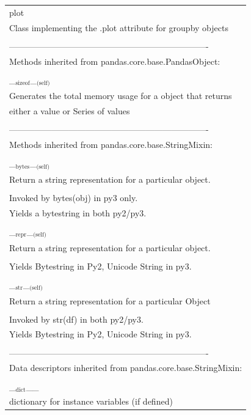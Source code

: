\documentclass[11pt]{article}
\begin{document}
\begin{enumerate}
\begin{enumerate}
\begin{enumerate}
\begin{center}
\begin{tabular}{l}
plot\\
Class implementing the .plot attribute for groupby objects\\
\\
----------------------------------------------------------------------\\
Methods inherited from pandas.core.base.PandasObject:\\
\\
\_\(_{\text{sizeof}}\)\_\(_{\text{(self)}}\)\\
Generates the total memory usage for a object that returns\\
either a value or Series of values\\
\\
----------------------------------------------------------------------\\
Methods inherited from pandas.core.base.StringMixin:\\
\\
\_\(_{\text{bytes}}\)\_\(_{\text{(self)}}\)\\
Return a string representation for a particular object.\\
\\
Invoked by bytes(obj) in py3 only.\\
Yields a bytestring in both py2/py3.\\
\\
\_\(_{\text{repr}}\)\_\(_{\text{(self)}}\)\\
Return a string representation for a particular object.\\
\\
Yields Bytestring in Py2, Unicode String in py3.\\
\\
\_\(_{\text{str}}\)\_\(_{\text{(self)}}\)\\
Return a string representation for a particular Object\\
\\
Invoked by str(df) in both py2/py3.\\
Yields Bytestring in Py2, Unicode String in py3.\\
\\
----------------------------------------------------------------------\\
Data descriptors inherited from pandas.core.base.StringMixin:\\
\\
\_\(_{\text{dict}}\)\_\_\\
dictionary for instance variables (if defined)\\

\end{tabular}
\end{center}
\end{enumerate}
\end{enumerate}
\end{enumerate}
\end{document}
